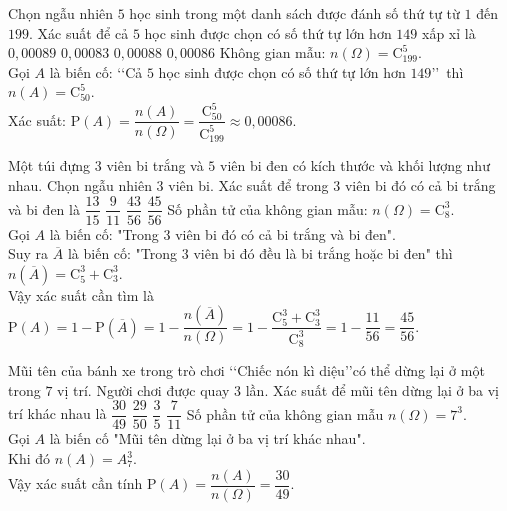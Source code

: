 \begin{ex}%
	Chọn ngẫu nhiên $5$ học sinh trong một danh sách được đánh số thứ tự từ $1$ đến $199$. Xác suất để cả $5$ học sinh được chọn có số thứ tự lớn hơn $149$ xấp xỉ là
	\choice
	{$0{,}00089$}
	{$0{,}00083$}
	{$0{,}00088$}
	{\True $0{,}00086$}
	\loigiai
	{
		Không gian mẫu: $n(\Omega)=\mathrm{C}^5_{199}$.\\
		Gọi $A$ là biến cố: \lq\lq  Cả $5$ học sinh được chọn có số thứ tự lớn hơn $149$\rq\rq \, thì $n(A)=\mathrm{C}^5_{50}$.\\
		Xác suất: $\mathrm{P}(A)=\dfrac{n(A)}{n(\Omega)} =\dfrac{\mathrm{C}^5_{50}}{\mathrm{C}^5_{199}}\approx 0{,}00086$.			
	}	
\end{ex}
\begin{ex}%
	Một túi đựng $3$ viên bi trắng và $5$ viên bi đen có kích thước và khối lượng như nhau. Chọn ngẫu nhiên $3$ viên bi. Xác suất để trong $3$ viên bi đó có cả bi trắng và bi đen là
	\choice
	{$\dfrac{13}{15}$}
	{$\dfrac{9}{11}$}
	{$\dfrac{43}{56}$}
	{\True $\dfrac{45}{56}$}
	\loigiai
	{
		Số phần tử của không gian mẫu: $n(\Omega)=\mathrm{C}^3_{8}$.\\
		Gọi $A$ là biến cố: "Trong $3$ viên bi đó có cả bi trắng và bi đen".\\
		Suy ra $\overline{A}$ là biến cố: "Trong $3$ viên bi đó đều là bi trắng hoặc bi đen" thì $n(\overline{A})=\mathrm{C}^3_{5}+\mathrm{C}^3_{3}$.\\
		Vậy xác suất cần tìm là $\mathrm{P}(A)=1-\mathrm{P}(\overline{A})=1-\dfrac{n\left(\overline{A}\right)}{n(\Omega)}=1-\dfrac{\mathrm{C}^3_{5}+\mathrm{C}^3_{3}}{\mathrm{C}^3_{8}}=1-\dfrac{11}{56}=\dfrac{45}{56}$.
	}	
\end{ex}
\begin{ex}%
	Mũi tên của bánh xe trong trò chơi \lq\lq  Chiếc nón kì diệu\rq\rq có thể dừng lại ở một trong $7$ vị trí. Người chơi được quay $3$ lần. Xác suất để mũi tên dừng lại ở ba vị trí khác nhau là
	\choice
	{\True $\dfrac{30}{49}$}
	{$\dfrac{29}{50}$}
	{$\dfrac{3}{5}$}
	{$\dfrac{7}{11}$}
	\loigiai
	{
		Số phần tử của không gian mẫu $n(\Omega)=7^3$.\\
		Gọi  $A$ là biến cố "Mũi tên dừng lại ở ba vị trí khác nhau".\\
		Khi đó $n(A)=A_{7}^{3}$.\\
		Vậy xác suất cần tính $ \mathrm{P}(A)=\dfrac{n(A)}{n(\Omega)}=\dfrac{30}{49}$. 		
	}	
\end{ex}
